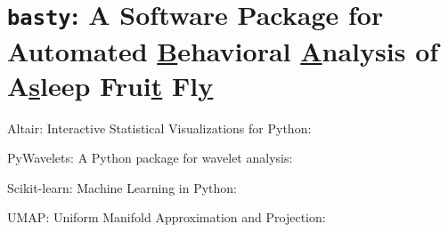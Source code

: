 \setlength{\parindent}{0pt}
\chapter{
  \texorpdfstring{
	  \texttt{basty}: A Software Package for Automated \underline{B}ehavioral \underline{A}nalysis of A\underline{s}leep Frui\underline{t} Fl\underline{y}
  }{
	  basty: A Software Package for Automated Behavioral Analysis of Asleep Fruit Fly
  }
 }

Altair: {Interactive} {Statistical} {Visualizations} for {Python}: \citep{vanderplas_altair_2018}

{PyWavelets}: {A} {Python} package for wavelet analysis: \citep{lee_pywavelets_2019}

Scikit-learn: {Machine} {Learning} in {Python}: \citep{pedregosa_scikit-learn_2011}

{UMAP}: {Uniform} {Manifold} {Approximation} and {Projection}: \citep{mcinnes_umap_2018}
